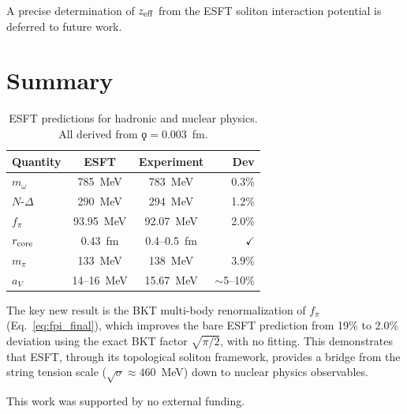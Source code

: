 ﻿\documentclass[twocolumn,showpacs,preprintnumbers,amsmath,amssymb,prc]{revtex4-2}
\begin{document}
A precise determination of $z_{\rm eff}$ from the ESFT soliton interaction potential is deferred to future work.

\section{Summary}

\begin{table}[h]
\caption{ESFT predictions for hadronic and nuclear physics. All derived from $\koppa = 0.003$~fm.}
\label{tab:summary}
\begin{ruledtabular}
\begin{tabular}{lccr}
Quantity & ESFT & Experiment & Dev \\
\hline
$m_\omega$ & 785~MeV & 783~MeV & 0.3\% \\
$N$-$\Delta$ & 290~MeV & 294~MeV & 1.2\% \\
$f_\pi$ & 93.95~MeV & 92.07~MeV & 2.0\% \\
$r_{\rm core}$ & 0.43~fm & 0.4--0.5~fm & $\checkmark$ \\
$m_\pi$ & 133~MeV & 138~MeV & 3.9\% \\
$a_V$ & 14--16~MeV & 15.67~MeV & $\sim$5--10\% \\
\end{tabular}
\end{ruledtabular}
\end{table}

The key new result is the BKT multi-body renormalization of $f_\pi$ (Eq.~\ref{eq:fpi_final}), which improves the bare ESFT prediction from 19\% to 2.0\% deviation using the exact BKT factor $\sqrt{\pi/2}$, with no fitting. This demonstrates that ESFT, through its topological soliton framework, provides a bridge from the string tension scale ($\sqrt{\sigma} \approx 460$~MeV) down to nuclear physics observables.

\begin{acknowledgments}
This work was supported by no external funding. \end{acknowledgments}
\end{document}
